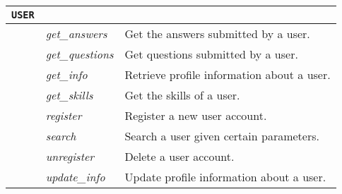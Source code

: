 \begin{table}
\begin{center}
\begin{tabular}{p{70px} | p{70px} | p{210px}}
				\hline
				\texttt{USER}					&	\\
				\hline
															& \emph{get\_answers}			& Get the answers submitted by a user. \\
															& \emph{get\_questions}		& Get questions submitted by a user. \\
															& \emph{get\_info}				&	Retrieve profile information about a user.	\\
															& \emph{get\_skills}			& Get the skills of a user. \\
															& \emph{register}					&	Register a new user account. \\
															& \emph{search}						&	Search a user given certain parameters. \\
															& \emph{unregister}				&	Delete a user account. \\
															& \emph{update\_info}			& Update profile information about a user. \\
				\hline
				\hline
		\end{tabular}
	\end{center}
	
\end{table}

